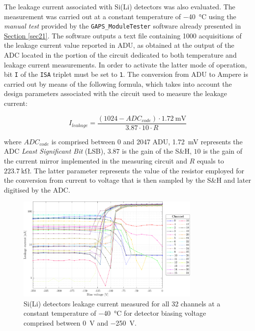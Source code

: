 The leakage current associated with Si(Li) detectors was also evaluated. The measurement was carried out at a constant temperature of \SI{-40}{\celsius} using the \textit{manual test} provided by the \texttt{GAPS\_ModuleTester} software already presented in \hyperref[sec21]{Section \ref{sec21}}. The software outputs a text file containing 1000 acquisitions of the leakage current value reported in ADU, as obtained at the output of the ADC located in the portion of the circuit dedicated to both temperature and leakage current measurements. In order to activate the latter mode of operation, bit \texttt{I} of the \texttt{ISA} triplet must be set to \texttt{1}. The conversion from ADU to Ampere is carried out by means of the following formula, which takes into account the design parameters associated with the circuit used to measure the leakage current:

\begin{equation}
    I_{leakage} = \frac{(1024 - ADC_{code}) \cdot \SI{1.72}{\milli\volt}}{3.87 \cdot 10 \cdot R}
\end{equation}

\noindent
where $ADC_{code}$ is comprised between 0 and 2047 ADU, \SI{1.72}{\milli\volt} represents the ADC \textit{Least Significant Bit} (LSB), $3.87$ is the gain of the S\&H, $10$ is the gain of the current mirror implemented in the measuring circuit and $R$ equals to $\SI{223.7}{\kilo\ohm}$. The latter parameter represents the value of the resistor employed for the conversion from current to voltage that is then sampled by the S\&H and later digitised by the ADC.

\begin{figure}[h!]
    \centering
    \includegraphics[width=0.8\textwidth]{Images/chap3/results/leakage_current.pdf}
    \caption{Si(Li) detectors leakage current measured for all 32 channels at a constant temperature of \SI{-40}{\celsius} for detector biasing voltage comprised between \SI{0}{\volt} and \SI{-250}{\volt}.}
    \label{figLeakageVoltages}
\end{figure}

